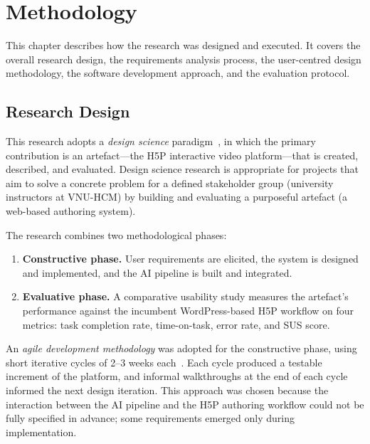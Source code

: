 \chapter{Methodology}

This chapter describes how the research was designed and executed. It covers
the overall research design, the requirements analysis process, the
user-centred design methodology, the software development approach, and the
evaluation protocol.

\section{Research Design}

This research adopts a \emph{design science} paradigm~\cite{sommerville2016},
in which the primary contribution is an artefact---the H5P interactive video
platform---that is created, described, and evaluated. Design science research
is appropriate for projects that aim to solve a concrete problem for a
defined stakeholder group (university instructors at VNU-HCM) by building
and evaluating a purposeful artefact (a web-based authoring system).

The research combines two methodological phases:

\begin{enumerate}
  \item \textbf{Constructive phase.} User requirements are elicited,
  the system is designed and implemented, and the AI pipeline is built and
  integrated.

  \item \textbf{Evaluative phase.} A comparative usability study measures
  the artefact's performance against the incumbent WordPress-based H5P
  workflow on four metrics: task completion rate, time-on-task, error rate,
  and SUS score.
\end{enumerate}

An \emph{agile development methodology} was adopted for the constructive
phase, using short iterative cycles of 2--3 weeks each~\cite{beck2001}. Each
cycle produced a testable increment of the platform, and informal
walkthroughs at the end of each cycle informed the next design iteration.
This approach was chosen because the interaction between the AI pipeline and
the H5P authoring workflow could not be fully specified in advance; some
requirements emerged only during implementation.

